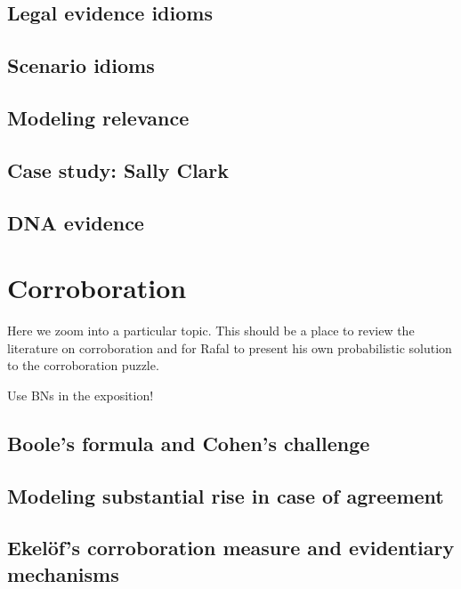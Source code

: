\documentclass[]{book}
\begin{document}
\section{Legal evidence idioms}

\section{Scenario idioms}

\section{Modeling relevance}

\section{Case study: Sally Clark}


\section{DNA evidence}


\chapter{Corroboration}

Here we zoom into a particular topic. This should be a
place to review the literature on corroboration and
for Rafal to present his own probabilistic solution
to the corroboration puzzle.

Use BNs in the exposition!

\section{Boole's formula and Cohen's challenge}

\section{Modeling substantial rise in case of agreement}

\section{Ekel\"of's corroboration measure and evidentiary mechanisms}
\end{document}
